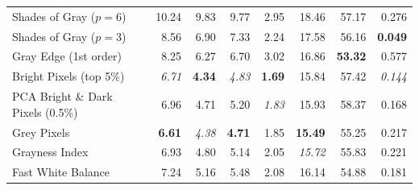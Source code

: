 \begin{longtable}{@{}>{\raggedright\arraybackslash}p{6.8cm}rrrrrrr@{}}
Shades of Gray ($p=6$)~\cite{shades_of_gray} & 10.24 & 9.83 & 9.77 & 2.95 & 18.46 & 57.17 & 0.276 \\
Shades of Gray ($p=3$)~\cite{shades_of_gray} & 8.56 & 6.90 & 7.33 & 2.24 & 17.58 & 56.16 & \textbf{0.049} \\
Gray Edge (1st order)~\cite{gray_edge} & 8.25 & 6.27 & 6.70 & 3.02 & 16.86 & \textbf{53.32} & 0.577 \\
Bright Pixels (top 5\%)~\cite{bright_pixels} & \textit{6.71} & \textbf{4.34} & \textit{4.83} & \textbf{1.69} & 15.84 & 57.42 & \textit{0.144} \\
PCA Bright \& Dark Pixels (0.5\%)~\cite{cheng2014illuminant} & 6.96 & 4.71 & 5.20 & \textit{1.83} & 15.93 & 58.37 & 0.168 \\
Grey Pixels~\cite{yangGrayPixels} & \textbf{6.61} & \textit{4.38} & \textbf{4.71} & 1.85 & \textbf{15.49} & 55.25 & 0.217 \\
Grayness Index~\cite{qianFindingGrayPixels} & 6.93 & 4.80 & 5.14 & 2.05 & \textit{15.72} & 55.83 & 0.221 \\
Fast White Balance~\cite{fast_wb_greyness} & 7.24 & 5.16 & 5.48 & 2.08 & 16.14 & 54.88 & 0.181 \\
\end{longtable}
\endgroup


